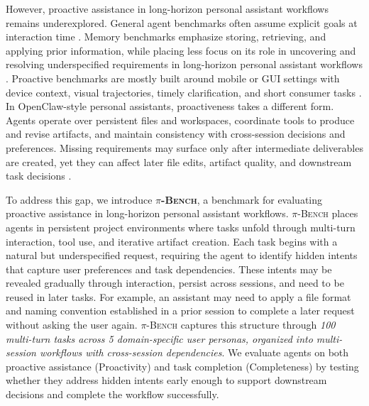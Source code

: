 \documentclass{llmxive}
\providecommand{\bench}{\textsc{$\pi$-Bench}}
\begin{document}
However, proactive assistance in long-horizon personal assistant workflows remains underexplored. General agent benchmarks often assume explicit goals at interaction time \citep{liu2023agentbench,kim2026persona2web,zhang2026clawbench}. Memory benchmarks emphasize storing, retrieving, and applying prior information, while placing less focus on its role in uncovering and resolving underspecified requirements in long-horizon personal assistant workflows \citep{shen2026mem2actbench,liu2026memgui,he2026memoryarena}. Proactive benchmarks are mostly built around mobile or GUI settings with device context, visual trajectories, timely clarification, and short consumer tasks \citep{chen2026knowu,chai2026pira,nathani2026proactive}. In OpenClaw-style personal assistants, proactiveness takes a different form. Agents operate over persistent files and workspaces, coordinate tools to produce and revise artifacts, and maintain consistency with cross-session decisions and preferences. Missing requirements may surface only after intermediate deliverables are created, yet they can affect later file edits, artifact quality, and downstream task decisions \citep{vidgen2026apex,ji2026clawarena}.

To address this gap, we introduce \textbf{\bench}, a benchmark for evaluating proactive assistance in long-horizon personal assistant workflows. {\bench} places agents in persistent project environments where tasks unfold through multi-turn interaction, tool use, and iterative artifact creation. Each task begins with a natural but underspecified request, requiring the agent to identify hidden intents that capture user preferences and task dependencies. These intents may be revealed gradually through interaction, persist across sessions, and need to be reused in later tasks. For example, an assistant may need to apply a file format and naming convention established in a prior session to complete a later request without asking the user again. {\bench} captures this structure through \textit{100 multi-turn tasks across 5 domain-specific user personas, organized into multi-session workflows with cross-session dependencies}. We evaluate agents on both proactive assistance (Proactivity) and task completion (Completeness) by testing whether they address hidden intents early enough to support downstream decisions and complete the workflow successfully.
\end{document}
